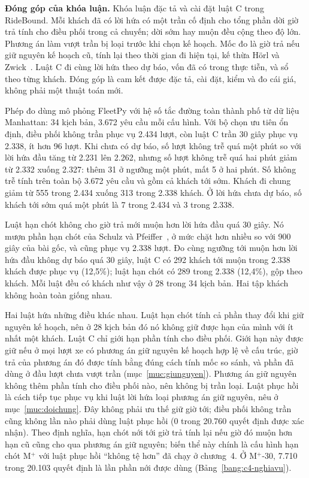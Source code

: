 \noindent\textbf{Đóng góp của khóa luận.} Khóa luận đặc tả và cài đặt luật C trong RideBound. Mỗi khách đã
có lời hứa có một trần cố định cho tổng phần dời giờ trả tính cho điều phối trong cả chuyến; dời sớm hay
muộn đều cộng theo độ lớn. Phương án làm vượt trần bị loại trước khi chọn kế hoạch. Mốc đo là giờ trả nếu
giữ nguyên kế hoạch cũ, tính lại theo thời gian đi hiện tại, kế thừa Hörl và Zwick~\cite{horl2022}.
Luật C đi cùng lời hứa theo dự báo, vốn đã có trong thực tiễn, và sổ theo từng khách. Đóng góp là cam kết
được đặc tả, cài đặt, kiểm và đo cái giá, không phải một thuật toán mới.

Phép đo dùng mô phỏng FleetPy với hệ số tắc đường toàn thành phố từ dữ liệu Manhattan: 34 kịch bản,
3.672 yêu cầu mỗi cấu hình. Với bộ chọn ưu tiên ổn định, điều phối không trần phục vụ 2.434 lượt, còn luật C trần 30 giây phục vụ
2.338, ít hơn 96 lượt. Khi chưa có dự báo, số lượt không trễ quá một phút so với lời hứa đầu tăng từ
2.231 lên 2.262, nhưng số lượt không trễ quá hai phút giảm từ 2.332 xuống 2.327: thêm 31 ở ngưỡng một
phút, mất 5 ở hai phút. Số không trễ tính trên toàn bộ 3.672 yêu cầu và gồm cả khách tới sớm. Khách đi chung giảm từ 555 trong 2.434 xuống 313 trong 2.338 khách.
Ở lời hứa chưa dự báo, số khách tới sớm quá một phút là 7 trong 2.434 và 3 trong 2.338.

Luật hạn chót không cho giờ trả mới muộn hơn lời hứa đầu quá 30 giây. Nó mượn phần hạn chót của Schulz và
Pfeiffer~\cite{schulz2026}, ở mức chặt hơn nhiều so với 900 giây của bài gốc, và cũng phục vụ 2.338 lượt.
Đo cùng ngưỡng tới muộn hơn lời hứa đầu không dự báo quá 30 giây, luật C có 292 khách tới muộn trong 2.338 khách được phục vụ
(12,5\%); luật hạn chót có 289 trong 2.338 (12,4\%), gộp theo khách. Mỗi luật đều có khách như vậy
ở 28 trong 34 kịch bản. Hai tập khách không hoàn toàn giống nhau.

Hai luật hứa những điều khác nhau. Luật hạn chót tính cả phần thay đổi khi giữ nguyên kế hoạch, nên ở
28 kịch bản đó nó không giữ được hạn của mình với ít nhất một khách. Luật C chỉ giới hạn phần tính cho
điều phối. Giới hạn này được giữ nếu ở mọi lượt xe có phương án giữ nguyên kế hoạch hợp lệ về cấu trúc, giờ trả của phương án
đó được tính bằng đúng cách tính mốc so sánh, và phần đã dùng ở đầu lượt chưa vượt trần
(mục~\ref{muc:giunguyen}). Phương án giữ nguyên không thêm phần tính cho điều phối nào, nên không bị
trần loại. Luật phục hồi là cách tiếp tục phục vụ khi luật lời hứa loại phương án giữ nguyên, nêu ở
mục~\ref{muc:doichung}. Đây không phải ưu thế giữ giờ tới; điều phối không trần cũng không lần nào phải dùng luật phục hồi
(0 trong 20.760 quyết định được xác nhận). Theo định nghĩa, hạn chót nới tới giờ trả tính lại nếu giờ đó muộn hơn hạn cũ cũng cho qua phương án
giữ nguyên; biến thể này chính là cấu hình hạn chót M$^{+}$ với luật phục hồi ``không tệ hơn'' đã chạy ở chương~4. Ở
M$^{+}$-30, 7.710 trong 20.103 quyết định là lần phần nới được dùng (Bảng~\ref{bang:c4-nghiavu}).

